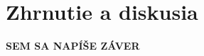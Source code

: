 \documentclass[report.tex]{subfiles}
\begin{document}
	
	\section{Zhrnutie a diskusia}	
	
	\textbf{SEM SA NAPÍŠE ZÁVER}
	
\end{document}
